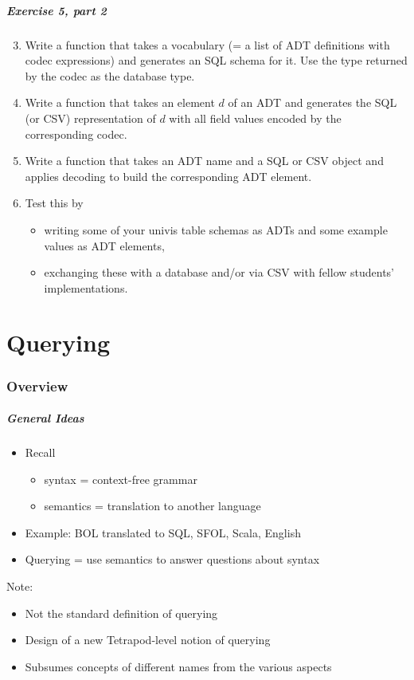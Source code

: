 \begin{frame}\frametitle{Exercise 5, part 2}

\begin{enumerate}
\setcounter{enumi}{2}
 \item Write a function that takes a vocabulary (= a list of ADT definitions with codec expressions) and generates an SQL schema for it.
 Use the type returned by the codec as the database type.
 \item Write a function that takes an element $d$ of an ADT and generates the SQL (or CSV) representation of $d$ with all field values encoded by the corresponding codec.
 \item Write a function that takes an ADT name and a SQL or CSV object and applies decoding to build the corresponding ADT element.
 \item Test this by
 \begin{itemize}
 \item writing some of your univis table schemas as ADTs and some example values as ADT elements,
 \item exchanging these with a database and/or via CSV with fellow students' implementations.
 \end{itemize}
\end{enumerate}
\end{frame}

\part{Querying}

\section{Overview}

\begin{frame}\frametitle{General Ideas}
\begin{itemize}
\item Recall
 \begin{itemize}
 \item syntax = context-free grammar
 \item semantics = translation to another language
 \end{itemize}
\item Example: BOL translated to SQL, SFOL, Scala, English
\item Querying = use semantics to answer questions about syntax
\end{itemize}
\medskip

Note:
\begin{itemize}
\item Not the standard definition of querying
\item Design of a new Tetrapod-level notion of querying
\item Subsumes concepts of different names from the various aspects
\end{itemize}
\end{frame}

